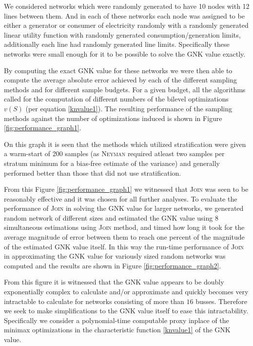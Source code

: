 We considered networks which were randomly generated to have 10 nodes with 12 lines between them.
And in each of these networks each node was assigned to be either a generator or consumer of electricity randomly with a randomly generated linear utility function with randomly generated consumption/generation limits, additionally each line had randomly generated line limits.
Specifically these networks were small enough for it to be possible to solve the GNK value exactly.

By computing the exact GNK value for these networks we were then able to compute the average absolute error achieved by each of the different sampling methods and for different sample budgets.
For a given budget, all the algorithms called for the computation of different numbers of the bilevel optimizations $v(S)$ (per equation \eqref{knvalue1}).
The resulting performance of the sampling methods against the number of optimizations induced is shown in Figure \ref{fig:performance_graph1}.

On this graph it is seen that the methods which utilized stratification were given a warm-start of 200 samples (as \textsc{Neyman} required atleast two samples per stratum minimum for a bias-free estimate of the variance) and generally performed better than those that did not use stratification.

From this Figure \ref{fig:performance_graph1} we witnessed that \textsc{Join} was seen to be reasonably effective and it was chosen for all further analyses.
To evaluate the performance of \textsc{Join} in solving the GNK value for larger networks, we generated random network of different sizes and estimated the GNK value using 8 simultaneous estimations using \textsc{Join} method, and timed how long it took for the average magnitude of error between them to reach one percent of the magnitude of the estimated GNK value itself.
In this way the run-time performance of \textsc{Join} in approximating the GNK value for variously sized random networks was computed and the results are shown in Figure \ref{fig:performance_graph2}.

From this figure it is witnessed that the GNK value appears to be doubly exponentially complex to calculate and/or approximate and quickly becomes very intractable to calculate for networks consisting of more than $16$ busses.
Therefore we seek to make simplifications to the GNK value itself to ease this intractability.
Specifically we consider a polynomial-time computable proxy inplace of the minimax optimizations in the characteristic function \eqref{knvalue1} of the GNK value.


